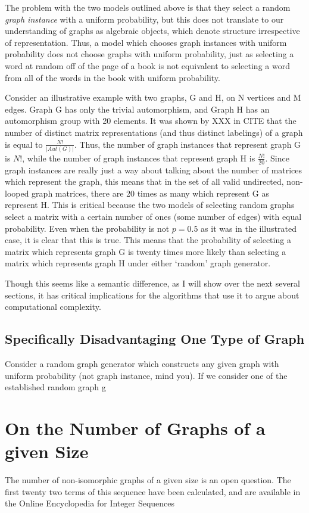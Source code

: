 \documentclass[11pt,a4paper]{report}
\begin{document}
The problem with the two models outlined above is that they select a random \emph{graph instance} with a uniform probability, but this does not translate to our understanding of graphs as algebraic objects, which denote structure irrespective of representation.
Thus, a model which chooses graph instances with uniform probability does not choose graphs with uniform probability, just as selecting a word at random off of the page of a book is not equivalent to selecting a word from all of the words in the book with uniform probability.

Consider an illustrative example with two graphs, G and H, on N vertices and M edges.
Graph G has only the trivial automorphism, and Graph H has an automorphism group with 20 elements.
It was shown by XXX in CITE that the number of distinct matrix representations (and thus distinct labelings) of a graph is equal to $\frac{N!}{|Aut(G)|}$.
Thus, the number of graph instances that represent graph G is $N!$, while the number of graph instances that represent graph H is $\frac{N!}{20}$.
Since graph instances are really just a way about talking about the number of matrices which represent the graph, this means that in the set of all valid undirected, non-looped graph matrices, there are 20 times as many which represent G as represent H.
This is critical because the two models of selecting random graphs select a matrix with a certain number of ones (some number of edges) with equal probability.
Even when the probability is not $p=0.5$ as it was in the illustrated case, it is clear that this is true.
This means that the probability of selecting a matrix which represents graph G is twenty times more likely than selecting a matrix which represents graph H under either `random' graph generator.

Though this seems like a semantic difference, as I will show over the next several sections, it has critical implications for the algorithms that use it to argue about computational complexity.

\subsection{Specifically Disadvantaging One Type of Graph}

Consider a random graph generator which constructs any given graph with uniform probability (not graph instance, mind you).
If we consider one of the established random graph g

\section{On the Number of Graphs of a given Size}
The number of non-isomorphic graphs of a given size is an open question.
The first twenty two terms of this sequence have been calculated, and are available in the Online Encyclopedia for Integer Sequences\cite{OEIS}
\end{document}

